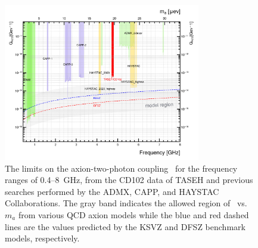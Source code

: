 \begin{figure} [htbp]
  \centering
 \includegraphics[width=8.6cm]{figures/RealData_limit_allexp.png}
  \caption{The limits on the axion-two-photon coupling \gagg\ for the 
frequency ranges of 0.4--8~GHz, from the CD102 data of TASEH and previous 
searches performed by the ADMX, CAPP, and HAYSTAC Collaborations. The gray 
band indicates the allowed region of \gagg\ vs. $m_a$ from various QCD axion 
models while the blue and red dashed lines are the values predicted by the 
KSVZ and DFSZ benchmark models, respectively.}
  \label{fig:gaggall}
\end{figure}


